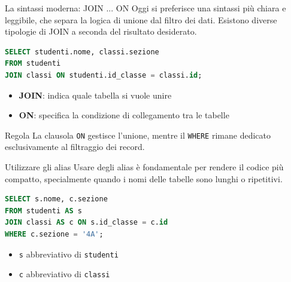 \documentclass{beamer}
\begin{document}

\begin{frame}[fragile]{La sintassi moderna: JOIN ... ON}
Oggi si preferisce una sintassi più chiara e leggibile, che separa la logica di unione dal filtro dei dati. Esistono diverse tipologie di JOIN a seconda del risultato desiderato.

\begin{lstlisting}[language=SQL]
SELECT studenti.nome, classi.sezione
FROM studenti
JOIN classi ON studenti.id_classe = classi.id;
\end{lstlisting}

\begin{itemize}
    \item \textbf{JOIN}: indica quale tabella si vuole unire
    \item \textbf{ON}: specifica la condizione di collegamento tra le tabelle
\end{itemize}

\medskip
\begin{block}{Regola}
La clausola \texttt{ON} gestisce l'unione, mentre il \texttt{WHERE} rimane dedicato esclusivamente al filtraggio dei record.
\end{block}
\end{frame}


\begin{frame}[fragile]{Utilizzare gli alias}
Usare degli alias è fondamentale per rendere il codice più compatto, specialmente quando i nomi delle tabelle sono lunghi o ripetitivi.

\begin{lstlisting}[language=SQL]
SELECT s.nome, c.sezione
FROM studenti AS s
JOIN classi AS c ON s.id_classe = c.id
WHERE c.sezione = '4A';
\end{lstlisting}

\begin{itemize}
    \item \texttt{s} abbreviativo di \texttt{studenti}
    \item \texttt{c} abbreviativo di \texttt{classi}
\end{itemize}
\end{frame}

\end{document}
